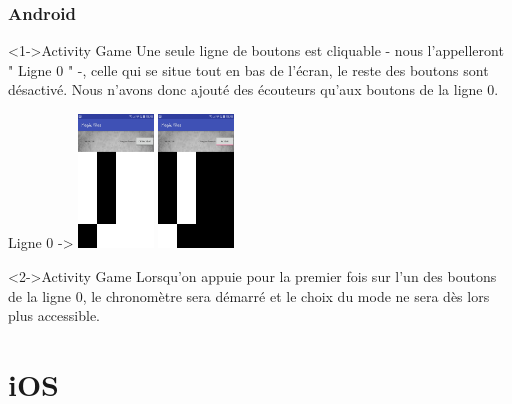 \documentclass{beamer}
\begin{document}
\begin{frame}
\frametitle<1->{Android}
\begin{block}<1->{Activity Game}
	Une seule ligne de boutons est cliquable - nous l'appelleront " {\color{red} Ligne 0} " -, celle qui se situe tout
en bas de l'écran, le reste des boutons sont désactivé. Nous n'avons donc ajouté des écouteurs
qu'aux boutons de la ligne 0.

\end{block}

   \begin{center}Ligne 0 ->
      \includegraphics[width=20mm]{AndroidGame}
      \includegraphics[width=20mm]{AndroidGameInvers}

    \end{center}

\begin{exampleblock}<2->{Activity Game}
	     {\small Lorsqu'on appuie pour la premier fois sur l'un des boutons de la ligne 0,
 { \color {red}le chronomètre sera démarré} et le choix du mode ne sera dès lors {\color {red} plus accessible}.}



\end{exampleblock}
   
\end{frame}






\section{iOS}
\end{document}

